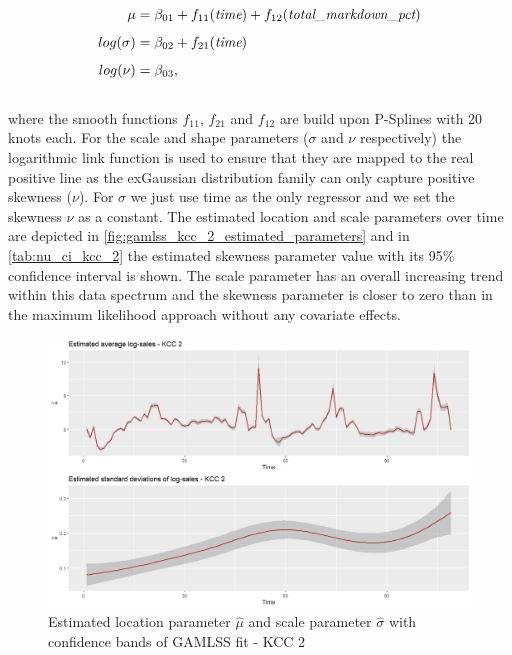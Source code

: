 \begin{equation}
\begin{aligned}
\mu &= \beta_{01} + f_{11}(\textit{time}) + f_{12}(\textit{total\_markdown\_pct}) \\ \noalign{\vskip5pt}
log(\sigma) &= \beta_{02} + f_{21}(\textit{time}) \\ \noalign{\vskip5pt}
log(\nu) &=  \beta_{03}, 
\end{aligned}
\label{eq:gamlss_kcc_2}
\end{equation} \\
where the smooth functions $f_{11}$, $f_{21}$ and $f_{12}$ are build upon P-Splines with 20 knots each. For the scale and shape parameters ($\sigma$ and $\nu$ respectively) the logarithmic link function is used to ensure that they are mapped to the real positive line as the exGaussian distribution family can only capture positive skewness ($\nu$). For $\sigma$ we just use time as the only regressor and we set the skewness $\nu$ as a constant. The estimated location and scale parameters over time are depicted in \autoref{fig:gamlss_kcc_2_estimated_parameters} and in \autoref{tab:nu_ci_kcc_2} the estimated skewness parameter value with its 95\% confidence interval is shown. The scale parameter has an overall increasing trend within this data spectrum and the skewness parameter is closer to zero than in the maximum likelihood approach without any covariate effects.
\\


\begin{figure}[H]
\centering
  \includegraphics[width=0.95\linewidth]{figures/gamlss_kcc_2_estimated_parameters.png}
  \caption{Estimated location parameter $\hat{\mu}$ and scale parameter $\hat{\sigma}$ with confidence bands of GAMLSS fit - KCC 2}
  \label{fig:gamlss_kcc_2_estimated_parameters}
\end{figure}





